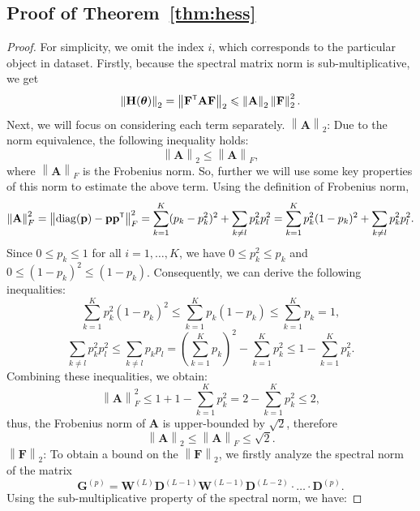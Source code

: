 \documentclass{article}
\begin{document}
\subsection{Proof of Theorem~\ref{thm:hess}}\label{app:thm:hess}
\begin{proof}
    For simplicity, we omit the index $i$, which corresponds to the particular object in dataset.
    Firstly, because the spectral matrix norm is sub-multiplicative, we get
    \[ \left\| \mathbf{H}(\boldsymbol{\theta}) \right\|_2 = \left\| \mathbf{F}\T \mathbf{A} \mathbf{F} \right\|_2 \leqslant \left\| \mathbf{A} \right\|_2 \left\| \mathbf{F} \right\|_2^2. \]
    Next, we will focus on considering each term separately.
    $\left\| \mathbf{A} \right\|_2$:
    Due to the norm equivalence, the following inequality holds:
    \[ \left\| \mathbf{A} \right\|_2 \leqslant \left\| \mathbf{A} \right\|_F, \]
    where $\left\| \mathbf{A} \right\|_F$ is the Frobenius norm. So, further we will use some key properties of this norm to estimate the above term. Using the definition of Frobenius norm,
    \[ \left\| \mathbf{A} \right\|_F^2 = \left\| \mathrm{diag}(\mathbf{p}) - \mathbf{p} \mathbf{p}\T \right\|_F^2 = \sum\limits_{k=1}^{K} (p_k - p_k^2)^2 + \sum\limits_{k \neq l} p_k^2 p_l^2 = \sum\limits_{k=1}^{K} p_k^2 (1 - p_k)^2 + \sum\limits_{k \neq l} p_k^2 p_l^2. \]
    Since $0 \leqslant p_k \leqslant 1$ for all $i = 1, \ldots, K$, we have $0 \leqslant p_k^2 \leqslant p_k$ and $0 \leqslant (1 - p_k)^2 \leqslant (1 - p_k)$. Consequently, we can derive the following inequalities:
    \[ \sum\limits_{k=1}^{K} p_k^2 (1 - p_k)^2 \leqslant \sum\limits_{k=1}^{K} p_k (1 - p_k) \leqslant \sum\limits_{k=1}^{K} p_k = 1, \]
    \[ \sum\limits_{k \neq l} p_k^2 p_l^2 \leqslant \sum\limits_{k \neq l} p_k p_l = \left( \sum\limits_{k=1}^{K} p_k \right)^2 - \sum\limits_{k=1}^{K} p_k^2 \leqslant 1 - \sum\limits_{k=1}^{K} p_k^2. \]
    Combining these inequalities, we obtain:
    \[ \left\| \mathbf{A} \right\|_F^2 \leqslant 1 + 1 - \sum\limits_{k=1}^{K} p_k^2 = 2 - \sum\limits_{k=1}^{K} p_k^2 \leqslant 2, \]
    thus, the Frobenius norm of $\mathbf{A}$ is upper-bounded by $\sqrt{2}$, therefore
    \[ \left\| \mathbf{A} \right\|_2 \leqslant \left\| \mathbf{A} \right\|_F \leqslant \sqrt{2}. \]
    $\left\| \mathbf{F} \right\|_2$:
    To obtain a bound on the $\left\| \mathbf{F} \right\|_2$, we firstly analyze the spectral norm of the matrix 
    \[ \mathbf{G}^{(p)} = \mathbf{W}^{(L)} \mathbf{D}^{(L-1)} \mathbf{W}^{(L-1)} \mathbf{D}^{(L-2)} \cdot \ldots \cdot \mathbf{D}^{(p)}.\] 
    Using the sub-multiplicative property of the spectral norm, we have:

\end{proof}
\end{document}
